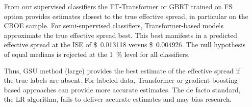 From our supervised classifiers the FT-Transformer or \gls{GBRT} trained on \gls{FS} option provides estimates closest to the true effective spread, in particular on the \gls{CBOE} sample. For semi-supervised classifiers, Transformer-based models approximate the true effective spread best. This best manifests in a predicted effective spread at the \gls{ISE} of \SI[round-mode=places, round-precision=3]{0.013118}[\$]{} versus \SI[round-mode=places, round-precision=3]{0.004926}[\$]{}. The null hypothesis of equal medians is rejected at the \SI{1}{\percent} level for all classifiers.

Thus, \gls{GSU} method (large) provides the best estimate of the effective spread if the true labels are absent. For labeled data, Transformer or gradient boosting-based approaches can provide more accurate estimates. The de facto standard, the \gls{LR} algorithm, fails to deliver accurate estimates and may bias research.


